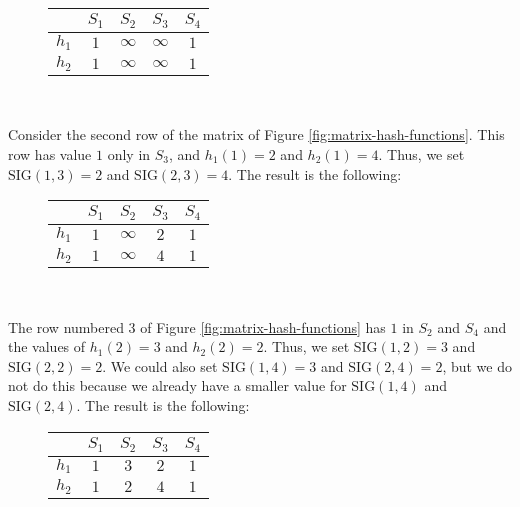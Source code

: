 \begin{figure}[H]
\centering
\begin{tabular}{|c||c|c|c|c|}
  \hline
   & $S_1$ & $S_2$ & $S_3$ & $S_4$\\
  \hline
  $h_1$ & $1$ & $\infty$ & $\infty$ & $1$ \\ 
  $h_2$ & $1$ & $\infty$ & $\infty$ & $1$ \\
  \hline
\end{tabular}
\captionsetup{justification=centering}\\
\label{fig:sig-matrix-1}
\end{figure}

Consider the second row of the matrix of Figure \ref{fig:matrix-hash-functions}. This row has value $1$ only in $S_3$, and $h_1(1) = 2$ and $h_2(1) = 4$. Thus, we set $\text{SIG}(1, 3) = 2$ and $\text{SIG}(2, 3) = 4$. The result is the following:

\begin{figure}[H]
\centering
\begin{tabular}{|c||c|c|c|c|}
  \hline
   & $S_1$ & $S_2$ & $S_3$ & $S_4$\\
  \hline
  $h_1$ & $1$ & $\infty$ & $2$ & $1$ \\ 
  $h_2$ & $1$ & $\infty$ & $4$ & $1$ \\
  \hline
\end{tabular}
\captionsetup{justification=centering}\\
\label{fig:sig-matrix-2}
\end{figure}

The row numbered 3 of Figure \ref{fig:matrix-hash-functions} has $1$ in $S_2$ and $S_4$ and the values of $h_1(2) = 3$ and $h_2(2) = 2$. Thus, we set $\text{SIG}(1, 2) = 3$ and $\text{SIG}(2, 2) = 2$. We could also set $\text{SIG}(1, 4) = 3$ and $\text{SIG}(2, 4) = 2$, but we do not do this because we already have a smaller value for $\text{SIG}(1, 4)$ and $\text{SIG}(2, 4)$. The result is the following:

\begin{figure}[H]
\centering
\begin{tabular}{|c||c|c|c|c|}
  \hline
   & $S_1$ & $S_2$ & $S_3$ & $S_4$\\
  \hline
  $h_1$ & $1$ & $3$ & $2$ & $1$ \\ 
  $h_2$ & $1$ & $2$ & $4$ & $1$ \\
  \hline
\end{tabular}
\captionsetup{justification=centering}\\
\label{fig:sig-matrix-3}
\end{figure}

